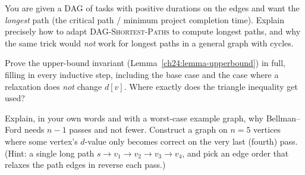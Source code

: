 \begin{exercise}\label{ch24:ex-longest-dag}
You are given a DAG of tasks with positive durations on the edges and want the
\emph{longest} path (the critical path / minimum project completion time). Explain
precisely how to adapt \textsc{DAG-Shortest-Paths} to compute longest paths, and
why the same trick would \emph{not} work for longest paths in a general graph with
cycles.
\end{exercise}

\begin{exercise}\label{ch24:ex-invariant}
Prove the upper-bound invariant (Lemma~\ref{ch24:lemma-upperbound}) in full,
filling in every inductive step, including the base case and the case where a
relaxation does \emph{not} change $d[v]$. Where exactly does the triangle
inequality get used?
\end{exercise}

\begin{exercise}\label{ch24:ex-why-n-minus-1}
Explain, in your own words and with a worst-case example graph, why Bellman--Ford
needs $n-1$ passes and not fewer. Construct a graph on $n=5$ vertices where some
vertex's $d$-value only becomes correct on the very last (fourth) pass. (Hint: a
single long path $s\to v_1\to v_2\to v_3\to v_4$, and pick an edge order that
relaxes the path edges in reverse each pass.)
\end{exercise}
